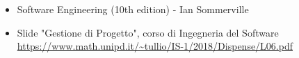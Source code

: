 \begin{itemize}
    \item Software Engineering (10th edition) - Ian Sommerville
    \item Slide "Gestione di Progetto", corso di Ingegneria del Software
          \newline \url{https://www.math.unipd.it/~tullio/IS-1/2018/Dispense/L06.pdf}
\end{itemize}